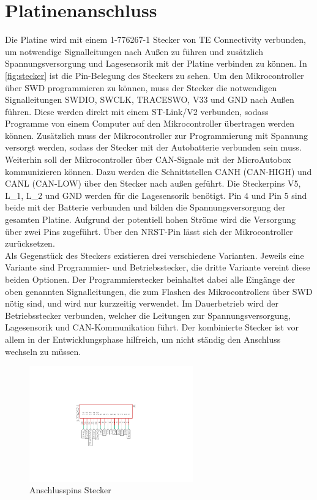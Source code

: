 \section{Platinenanschluss}\label{sec:stecker}
Die Platine wird mit einem 1-776267-1 Stecker von TE Connectivity verbunden, um notwendige Signalleitungen nach Außen zu führen und zusätzlich Spannungsversorgung und Lagesensorik mit der Platine verbinden zu können. In \autoref{fig:stecker} ist die Pin-Belegung des Steckers zu sehen. Um den Mikrocontroller über SWD programmieren zu können, muss der Stecker die notwendigen Signalleitungen SWDIO, SWCLK, TRACESWO, V33 und GND nach Außen führen. Diese werden direkt mit einem ST-Link/V2 verbunden, sodass Programme von einem Computer auf den Mikrocontroller übertragen werden können. Zusätzlich muss der Mikrocontroller zur Programmierung mit Spannung versorgt werden, sodass der Stecker mit der Autobatterie verbunden sein muss. Weiterhin soll der Mikrocontroller über CAN-Signale mit der MicroAutobox kommunizieren können. Dazu werden die Schnittstellen CANH (CAN-HIGH) und CANL (CAN-LOW) über den Stecker nach außen geführt. Die Steckerpins V5, L\_1, L\_2 und GND werden für die Lagesensorik benötigt. Pin 4 und Pin 5 sind beide mit der Batterie verbunden und bilden die Spannungsversorgung der gesamten Platine. Aufgrund der potentiell hohen Ströme wird die Versorgung über zwei Pins zugeführt. Über den NRST-Pin lässt sich der Mikrocontroller zurücksetzen.\\ Als Gegenstück des Steckers existieren drei verschiedene Varianten. Jeweils eine Variante sind Programmier- und Betriebsstecker, die dritte Variante vereint diese beiden Optionen. Der Programmierstecker beinhaltet dabei alle Eingänge der oben genannten Signalleitungen, die zum Flashen des Mikrocontrollers über SWD nötig sind, und wird nur kurzzeitig verwendet. Im Dauerbetrieb wird der Betriebsstecker verbunden, welcher die Leitungen zur Spannungsversorgung, Lagesensorik und CAN-Kommunikation führt. Der kombinierte Stecker ist vor allem in der Entwicklungsphase hilfreich, um nicht ständig den Anschluss wechseln zu müssen. 


\begin{figure}[H]%
\centering
\includegraphics[width=200pt]{./Bilder/stecker.pdf}%
\caption{Anschlusspins Stecker}%
\label{fig:stecker}%
\end{figure}

